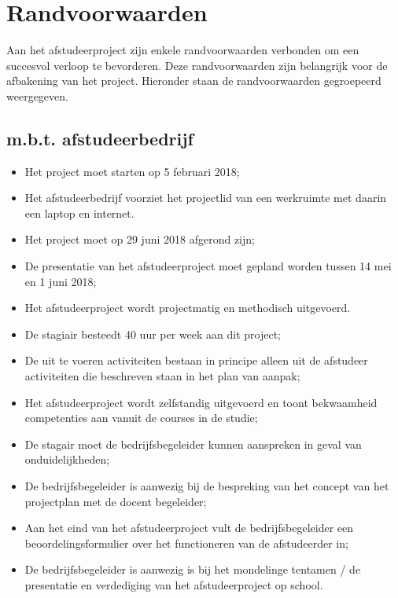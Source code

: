 \chapter{Randvoorwaarden}
Aan het afstudeerproject zijn enkele randvoorwaarden verbonden om een succesvol verloop te bevorderen. Deze randvoorwaarden zijn belangrijk voor de afbakening van het project. Hieronder staan de randvoorwaarden gegroepeerd weergegeven.\par

\section{m.b.t. afstudeerbedrijf}
\begin{itemize}
  \item Het project moet starten op 5 februari 2018;
  \item Het afstudeerbedrijf voorziet het projectlid van een werkruimte met daarin een laptop en internet.
  \item Het project moet op 29 juni 2018 afgerond zijn;
  \item De presentatie van het afstudeerproject moet gepland worden tussen 14 mei en 1 juni 2018;
  \item Het afstudeerproject wordt projectmatig en methodisch uitgevoerd.
  \item De stagiair besteedt 40 uur per week aan dit project;
  \item De uit te voeren activiteiten bestaan in principe alleen uit de afstudeer activiteiten die beschreven staan in het plan van aanpak;
  \item Het afstudeerproject wordt zelfstandig uitgevoerd en toont bekwaamheid competenties aan vanuit de courses in de studie;
  \item De stagair moet de bedrijfsbegeleider kunnen aanspreken in geval van onduidelijkheden;
  \item De bedrijfsbegeleider is aanwezig bij de bespreking van het concept van het projectplan met de docent begeleider;
  \item Aan het eind van het afstudeerproject vult de bedrijfsbegeleider een beoordelingsformulier over het functioneren van de afstudeerder in;
  \item De bedrijfsbegeleider is aanwezig is bij het mondelinge tentamen / de presentatie en verdediging van het afstudeerproject op school.
\end{itemize}

